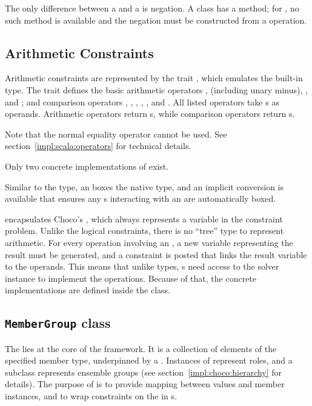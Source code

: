 The only difference between a  and a  is negation. A 
class has a  method; for , no such method is available and the
negation must be constructed from a  operation.


\subsection{Arithmetic Constraints}
\label{impl:solver:arithm}

Arithmetic constraints are represented by the trait , which emulates the
built-in  type. The trait defines the basic arithmetic operators \dop{+},
\dop{-} (including unary minus), \dop{*}, and \dop{/}; and comparison operators
\dop{===}, \dop{!=}, \dop{<}, \dop{>}, \dop{<=}, and \dop{>=}. All listed operators take
s as operands. Arithmetic operators return s, while comparison
operators return s.

Note that the normal equality operator \dop{==} cannot be used. See
section~\ref{impl:scala:operators} for technical details.

Only two concrete implementations of  exist.

Similar to the  type, an  boxes the native 
type, and an implicit conversion is available that ensures any s interacting
with an  are automatically boxed.

 encapsulates Choco's , which always represents a variable
in the constraint problem. Unlike the logical constraints, there is no ``tree'' type to
represent arithmetic. For every operation involving an , a new variable
representing the result must be generated, and a constraint is posted that links the
result variable to the operands. This means that unlike  types,
s need access to the solver instance to implement the operations. Because of
that, the concrete implementations are defined inside the  class.


\subsection{\texttt{MemberGroup} class}
\label{impl:solver:groups}

The  lies at the core of the framework. It is a collection of elements
of the specified member type, underpinned by a . Instances of
 represent roles, and a subclass 
represents ensemble groups (see section~\ref{impl:choco:hierarchy} for details). The
purpose of  is to provide mapping between  values and member
instances, and to wrap constraints on the  in s.

